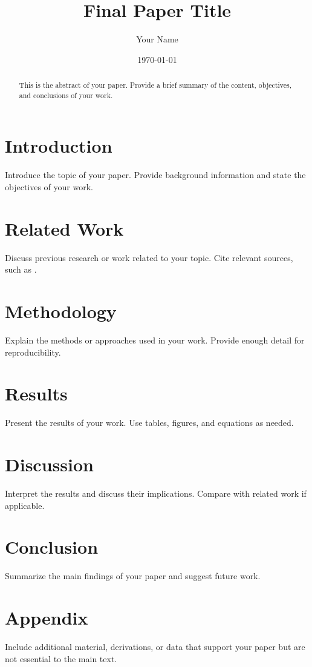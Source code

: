\documentclass[12pt]{article}
\title{Final Paper Title}
\author{Your Name}
\date{\today}
\begin{document}
\maketitle

\begin{abstract}
This is the abstract of your paper. Provide a brief summary of the content, objectives, and conclusions of your work.
\end{abstract}

\section{Introduction}
Introduce the topic of your paper. Provide background information and state the objectives of your work.

\section{Related Work}
Discuss previous research or work related to your topic. Cite relevant sources, such as \cite{GOYAL2020220}.

\section{Methodology}
Explain the methods or approaches used in your work. Provide enough detail for reproducibility.\cite{Fan2019}

\section{Results}
Present the results of your work. Use tables, figures, and equations as needed.\cite{中值滤波}

\section{Discussion}
Interpret the results and discuss their implications. Compare with related work if applicable.

\section{Conclusion}
Summarize the main findings of your paper and suggest future work.

\appendix
\section{Appendix}
Include additional material, derivations, or data that support your paper but are not essential to the main text.



\end{document}
